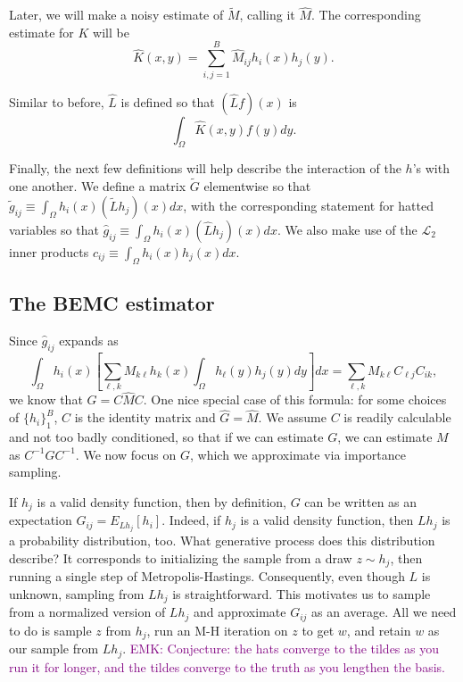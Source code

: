 \documentclass{article}
\newcommand\EMK[1]{\textcolor{purple}{EMK: #1}}
\begin{document}
Later, we will make a noisy estimate of $\tilde{M}$, calling it $\hat M$. The corresponding estimate for $K$ will be 
\begin{equation}
\label{eqn:khatdef}
\hat{K}(x,y) = \sum_{i,j=1}^B \hat M_{ij} h_i(x)h_j(y).\end{equation}

Similar to before, $\hat{L}$ is defined so that $(\hat{L}f)(x)$ is $$\int_{\Omega}\hat{K}(x,y)f(y)dy.$$


Finally, the next few definitions will help describe the interaction of the $h$'s with one another. We define a matrix $\tilde{G}$ elementwise so that $\tilde{g}_{ij}\equiv \int_{\Omega} h_i(x)(\tilde{L}h_j)(x)dx$, with the corresponding statement for hatted variables so that $\hat{g}_{ij}\equiv \int_{\Omega} h_i(x)(\hat{L}h_j)(x)dx$. We also make use of the $\mathcal{L}_2$ inner products $c_{ij}\equiv \int_{\Omega} h_i(x)h_j(x)dx$.

\subsection{The BEMC estimator}

Since $\hat{g}_{ij}$ expands as $$ \int_{\Omega} h_i(x)\left[\sum_{\ell,k} M_{k\ell}h_k(x)\int_{\Omega} h_\ell(y)h_j(y)dy\right]dx= \sum_{\ell,k} M_{k\ell}C_{\ell j}C_{ik},$$ we know that $\hat{G}=C\hat M C$. One nice special case of this formula: for some choices of $\{h_i\}_1^B$, $C$ is the identity matrix and $\hat{G}= \hat M$. We assume $C$ is readily calculable and not too badly conditioned, so that if we can estimate $G$, we can estimate $M$ as $C^{-1}GC^{-1}$. We now focus on $G$, which we approximate via importance sampling. 

If $h_j$ is a valid density function, then by definition, $G$ can be written as an expectation $G_{ij} = E_{Lh_j}[h_i]$. Indeed, if $h_j$ is a valid density function, then $Lh_j$ is a probability distribution, too. What generative process does this distribution describe? It corresponds to initializing the sample from a draw $z\sim h_j$, then running a single step of Metropolis-Hastings. Consequently, even though $L$ is unknown, sampling from $Lh_j$ is straightforward. This motivates us to sample from a normalized version of $Lh_j$ and approximate $G_{ij}$ as an average. All we need to do is sample $z$ from $h_j$, run an M-H iteration on $z$ to get $w$, and retain $w$ as our sample from $Lh_j$. \EMK{Conjecture: the hats converge to the tildes as you run it for longer, and the tildes converge to the truth as you lengthen the basis.}
\end{document}
